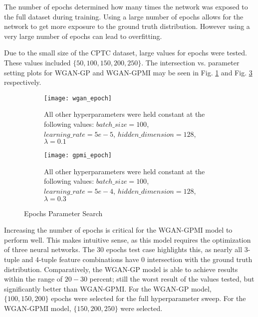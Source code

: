 The number of epochs determined how many times the network was exposed to the full dataset during training. Using a large number of epochs allows for the network to get more exposure to the ground truth distribution. However using a very large number of epochs can lead to overfitting.

Due to the small size of the CPTC dataset, large values for epochs were tested. These values included $\{50, 100, 150, 200, 250\}$. The intersection vs. parameter setting plots for WGAN-GP and WGAN-GPMI may be seen in Fig. \ref{fig:wgan_epoch} and Fig. \ref{fig:gpmi_epoch} respectively.

\begin{figure}[!htbp]
	\centering
	\begin{subfigure}{.7\textwidth}
		\texttt{[image: wgan\_epoch]}
	\end{subfigure}%
	\begin{subfigure}{.3\textwidth}
		\caption{
			All other hyperparameters were held constant at the following values: $batch\_size = 100$, $learning\_rate=5e-5$, $hidden\_dimension=128$, $\lambda=0.1$
		}
		\label{fig:wgan_epoch}
	\end{subfigure}%

	\begin{subfigure}{.7\textwidth}
		\texttt{[image: gpmi\_epoch]}
	\end{subfigure}%
	\begin{subfigure}{.3\textwidth}
		\caption{
			All other hyperparameters were held constant at the following values: $batch\_size=100$, $learning\_rate=5e-4$, $hidden\_dimension=128$, $\lambda=0.3$
		}
		\label{fig:gpmi_epoch}
	\end{subfigure}%
	\caption{Epochs Parameter Search}
\end{figure}

Increasing the number of epochs is critical for the WGAN-GPMI model to perform well. This makes intuitive sense, as this model requires the optimization of three neural networks. The $30$ epochs test case highlights this, as nearly all 3-tuple and 4-tuple feature combinations have 0 intersection with the ground truth distribution. Comparatively, the WGAN-GP model is able to achieve results within the range of $20-30$ percent; still the worst result of the values tested, but significantly better than WGAN-GPMI. For the WGAN-GP model, $\{100,150,200\}$ epochs were selected for the full hyperparameter sweep. For the WGAN-GPMI model, $\{150, 200, 250\}$ were selected.


